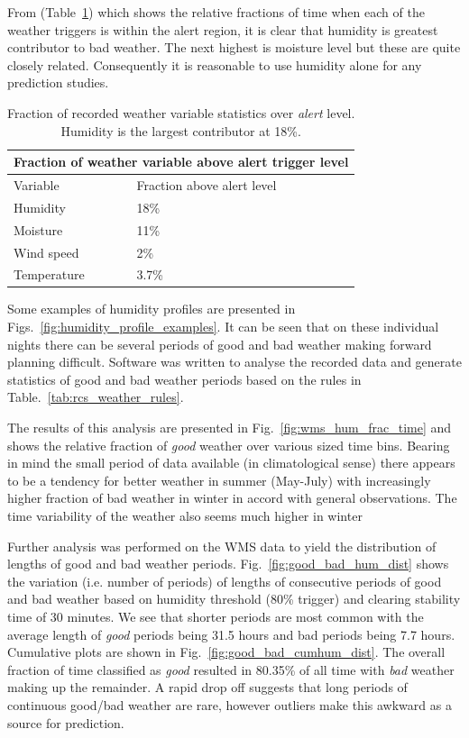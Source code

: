 From (Table~\ref{tab:comp_meteo_trigs}) which shows the relative fractions of time when each of the weather triggers is within the alert region, it is clear that humidity is greatest contributor to bad weather. The next highest is moisture level but these are quite closely related. Consequently it is reasonable to use humidity alone for any prediction studies.
\begin{table}[htbp]
\begin{center}
\begin{tabular}{ll}
\toprule
\multicolumn{2}{c}{Fraction of weather variable above alert trigger level} \\
\midrule
Variable & Fraction above alert level\\
\midrule
Humidity    & 18\%  \\
Moisture    & 11\%  \\
Wind speed  & 2\%   \\
Temperature & 3.7\% \\
\bottomrule
\end{tabular}
\end{center}
\caption[Fraction of recorded weather variable statistics over \emph{alert} level.]{Fraction of recorded weather variable statistics over \emph{alert} level. Humidity is the largest contributor at 18\%.}
\label{tab:comp_meteo_trigs}
\end{table}

Some examples of humidity profiles are presented in Figs.~\ref{fig:humidity_profile_examples}. It can be seen that on these individual nights there can be several periods of good and bad weather making forward planning difficult. Software was written to analyse the recorded data and generate statistics of good and bad weather periods based on the rules in Table.~\ref{tab:rcs_weather_rules}.

The results of this analysis are presented in Fig.~\ref{fig:wms_hum_frac_time} and shows the relative fraction of \emph{good} weather over various sized time bins. Bearing in mind the small period of data available (in climatological sense) there appears to be a tendency for better weather in summer (May-July) with increasingly higher fraction of bad weather in winter in accord with general observations. The time variability of the weather also seems much higher in winter

Further analysis was performed on the WMS data to yield the distribution of lengths of good and bad weather periods. Fig.~\ref{fig:good_bad_hum_dist} shows the variation (i.e. number of periods) of lengths  of consecutive periods of good and bad weather based on humidity threshold (80\% trigger) and clearing stability time of 30 minutes. We see that shorter periods are most common with the average length of \emph{good} periods being 31.5 hours and bad periods being 7.7 hours. Cumulative plots are shown in Fig.~\ref{fig:good_bad_cumhum_dist}. The overall fraction of time classified as \emph{good} resulted in 80.35\% of all time with \emph{bad} weather making up the remainder. A rapid drop off suggests that long periods of continuous good/bad weather are rare, however outliers make this awkward as a source for prediction.

